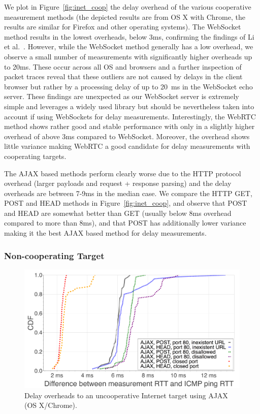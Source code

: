 \documentclass{sig-alternate-10pt}
\begin{document}
We plot in Figure~\ref{fig:inet_coop} the delay overhead of the various cooperative measurement methods (the depicted results are from OS X with Chrome, the results are similar for Firefox and other operating systems). The WebSocket method results in the lowest overheads, below 3ms, confirming the findings of Li et al.~\cite{li_appraising_2013}. However, while the WebSocket method generally has a low overhead, we observe a small number of measurements with significantly higher overheads up to 20ms. These occur across all OS and browsers and a further inspection of packet traces reveal that these outliers are not caused by delays in the client browser but rather by a processing delay of up to 20~ms in the WebSocket echo server. These findings are unexpected as our WebSocket server is extremely simple and leverages a widely used library but should be nevertheless taken into account if using WebSockets for delay measurements. Interestingly, the WebRTC method shows rather good and stable performance with only in a slightly higher overhead of above 3ms compared to WebSocket. Moreover, the overhead shows little variance making WebRTC a good candidate for delay measurements with cooperating targets.

The AJAX based methods perform clearly worse due to the HTTP protocol overhead (larger payloads and request + response parsing) and the delay overheads are between 7-9ms in the median case. We compare the HTTP GET, POST and HEAD methods in Figure~\ref{fig:inet_coop}, and observe that POST and HEAD are somewhat better than GET (usually below 8ms overhead compared to more than 8ms), and that POST has additionally lower variance making it the best AJAX based method for delay measurements. 

\subsubsection{Non-cooperating Target}

\begin{figure}[h]
\includegraphics[width=\columnwidth]{figures/inet-non-coop-new}
\caption{Delay overheads to an uncooperative Internet target using AJAX (OS X/Chrome).}
\label{fig:inet_non_coop_new}
\end{figure}
\end{document}
